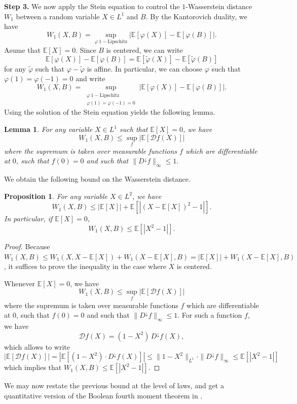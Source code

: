 \documentclass[10pt, reqno]{amsart}
\numberwithin{equation}{section}
\theoremstyle{definition}
\theoremstyle{plain}
\newtheorem{proposition}[definition]{Proposition}
\newtheorem{lemma}[definition]{Lemma}
\theoremstyle{remark}
\newcommand{\1}{\mathbbm{1}}
\begin{document}
\noindent \textbf{Step 3.} We now apply the Stein equation to control 
the $1$-Wasserstein distance $W_1$ between a random variable $X\in L^1$ and $B$. By the Kantorovich duality, we have
$$W_1(X,B)=\sup_{\varphi\ 1-\text{Lipschitz}}|\mathbb{E}[\varphi(X)]-\mathbb{E}[\varphi(B)]|.$$
Asume that $\mathbb{E}[X]=0$. Since $B$ is centered, we can write
$$
\mathbb{E}[\varphi(X)]-\mathbb{E}[\varphi(B)]=\mathbb{E}[\tilde{\varphi}(X)]-\mathbb{E}[\tilde{\varphi}(B)]$$
for any $\tilde{\varphi}$ such that $\varphi-\tilde{\varphi}$ is affine. In particular, we can choose $\varphi$ such that $\varphi(1)=\varphi(-1)=0$ and write
$$W_1(X,B)=\sup_{\substack{\varphi\ 1-\text{Lipschitz}\\ \varphi(1)=\varphi(-1)=0}}|\mathbb{E}[\varphi(X)]-\mathbb{E}[\varphi(B)]|.$$
Using the solution of the Stein equation yields the following lemma.
\begin{lemma}For any variable $X\in L^1$ such that $\mathbb{E}[X]=0$, we have
$$W_1(X,B)\leq \sup_{f}|\mathbb{E}[\mathcal{D}f(X)]|$$
where the supremum is taken over measurable functions $f$ which are differentiable at $0$, such that $f(0)=0$ and such that $\|D^\downarrow f\|_\infty\leq 1.$
\end{lemma}
We obtain the following bound on the Wasserstein distance.
\begin{proposition}For any variable $X\in L^2$, we have
$$W_1(X,B)\leq |\mathbb{E}[X]|+\mathbb{E}\left[\left|(X-\mathbb{E}[X])^2-1\right|\right].$$
In particular, if $\mathbb{E}[X]=0$,
$$W_1(X,B)\leq \mathbb{E}\left[\left|X^2-1\right|\right].$$
\end{proposition}
\begin{proof}
Because $W_1(X,B)\leq W_1(X,X-\mathbb{E}[X])+W_1(X-\mathbb{E}[X],B)=|\mathbb{E}[X]|+W_1(X-\mathbb{E}[X],B)$, it suffices to prove the inequality in the case where $X$ is centered.

Whenever $\mathbb{E}[X]=0$, we have
$$W_1(X,B)\leq \sup_{f}|\mathbb{E}[\mathcal{D}f(X)]|$$where the supremum is taken over measurable functions $f$ which are differentiable at $0$, such that $f(0)=0$ and such that $\|D^\downarrow f\|_\infty\leq 1.$ For such a function $f$, we have  \[
\mathcal D f(X)=(1-X^2)\,D^\downarrow f(X),
\] which allows to write
$$|\mathbb{E}[\mathcal{D}f(X)]|=|\mathbb{E}[(1-X^2)\cdot D^\downarrow f(X)]|\leq \|1-X^2\|_{L^1}\cdot \|D^\downarrow f\|_\infty\leq \mathbb{E}\left[\left|X^2-1\right|\right]$$
which implies that $W_1(X,B)\leq \mathbb{E}\left[\left|X^2-1\right|\right]$.
\end{proof}
We may now restate the previous bound at the level of laws, and get a quantitative version of the Boolean fourth moment theorem in \cite[Lemma 3.1]{Arizmendi2013}.
\end{document}
